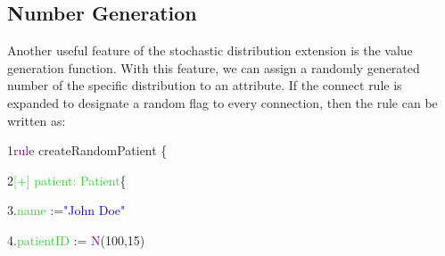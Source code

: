 {%



%






\subsection{Number Generation}

Another useful feature of the stochastic distribution extension is the value generation function. With this feature, we can assign a randomly generated number of the specific distribution to an attribute. If the connect rule is expanded to designate a random flag to every connection, then the rule can be written as:\newline

{

1\hspace{0.5cm}\textcolor{Purple}{rule} createRandomPatient \{

2\hspace{1cm}\textcolor{LimeGreen}{[+] patient: Patient}\{

3\hspace{1.5cm}.\textcolor{LimeGreen}{name} :=\textcolor{Blue}{"John Doe"}

4\hspace{1.5cm}.\textcolor{LimeGreen}{patientID} := \textcolor{Purple}{N}(100,15)

}}
